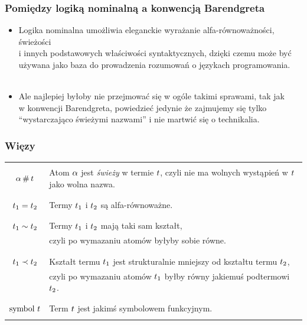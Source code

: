 \documentclass[aspectratio=169]{beamer}
\renewcommand{\it}[1]{\textit{#1}}
\begin{document}
\begin{frame}
\frametitle{Pomiędzy logiką nominalną a konwencją Barendgreta}
\begin{itemize}
  \item Logika nominalna umożliwia eleganckie wyrażanie alfa-równoważności, świeżości \\
        i innych podstawowych właściwości syntaktycznych, dzięki czemu może być \\
        używana jako baza do prowadzenia rozumowań o językach programowania.
  \\
  \\
  \item Ale najlepiej byłoby nie przejmować się w ogóle takimi sprawami, tak jak \\
        w konwencji Barendgreta, powiedzieć jedynie że zajmujemy się tylko \\
        “wystarczająco świeżymi nazwami” i nie martwić się o technikalia.
  \end{itemize}
\end{frame}

\begin{frame}
\frametitle{Więzy}
  \begin{tabularx}{\linewidth}{|c|X|}
    \hline & \\
    $\alpha \,\#\, t$ & Atom $\alpha$ jest \it{świeży} w termie $t$,
      czyli nie ma wolnych wystąpień w $t$ jako wolna nazwa. \\ & \\
    \hline & \\
    $t_1 = t_2$ & Termy $t_1$ i $t_2$ są alfa-równoważne. \\ & \\
    \hline & \\
    $t_1 \sim t_2$ & Termy $t_1$ i $t_2$ mają taki sam kształt,
    \\ & czyli po wymazaniu atomów byłyby sobie równe. \\ & \\
    \hline & \\
    $t_1 \prec t_2$ & Kształt termu $t_1$ jest strukturalnie mniejszy od kształtu termu $t_2$,
    \\ & czyli po wymazaniu atomów $t_1$ byłby równy jakiemuś podtermowi $t_2$.
    \\ & \\
    \hline & \\
    $\text{symbol } t$ & Term $t$ jest jakimś symbolowem funkcyjnym. \\ & \\
    \hline
  \end{tabularx}
\end{frame}
\end{document}
